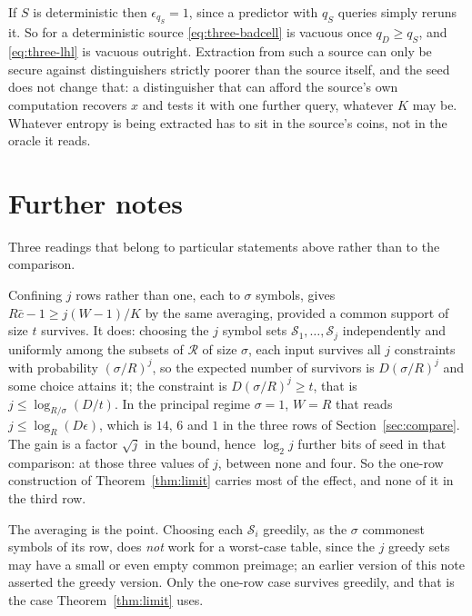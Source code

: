 \documentclass{aicr-solution}
\newcommand{\calR}{\mathcal{R}}
\newcommand{\calS}{\mathcal{S}}
\begin{document}
\begin{remark}\label{rem:det}
If $S$ is deterministic then $\epsilon_{q_S} = 1$, since a predictor with $q_S$ queries simply reruns
it. So for a deterministic source \eqref{eq:three-badcell} is vacuous once $q_D \ge q_S$, and
\eqref{eq:three-lhl} is vacuous outright. Extraction from such a source can only be secure against
distinguishers strictly poorer than the source itself, and the seed does not change that: a
distinguisher that can afford the source's own computation recovers $x$ and tests it with one
further query, whatever $K$ may be. Whatever entropy is being extracted has to sit in the source's
coins, not in the oracle it reads.
\end{remark}

\section{Further notes}\label{sec:notes}

Three readings that belong to particular statements above rather than to the comparison.

\begin{remark}\label{rem:multi}
Confining $j$ rows rather than one, each to $\sigma$ symbols, gives $R\bar c - 1 \ge j(W-1)/K$ by
the same averaging, provided a common support of size $t$ survives. It does: choosing the $j$ symbol
sets $\calS_1,\dots,\calS_j$ independently and uniformly among the subsets of $\calR$ of size
$\sigma$, each input survives all $j$ constraints with probability $(\sigma/R)^{j}$, so the expected
number of survivors is $D(\sigma/R)^{j}$ and some choice attains it; the constraint is
$D(\sigma/R)^{j} \ge t$, that is $j \le \log_{R/\sigma}(D/t)$. In the principal regime
$\sigma = 1$, $W = R$ that reads $j \le \log_R(D\epsilon)$, which is $14$, $6$ and $1$ in the three
rows of Section~\ref{sec:compare}. The gain is a factor $\sqrt{j}$ in the
bound, hence $\log_2 j$ further bits of seed in that comparison: at those three values of $j$,
between none and four. So the one-row construction of Theorem~\ref{thm:limit} carries most of the
effect, and none of it in the third row.

The averaging is the point. Choosing each $\calS_i$ greedily, as the $\sigma$ commonest symbols of
its row, does \emph{not} work for a worst-case table, since the $j$ greedy sets may have a small or
even empty common preimage; an earlier version of this note asserted the greedy version. Only the
one-row case survives greedily, and that is the case Theorem~\ref{thm:limit} uses.
\end{remark}
\end{document}
